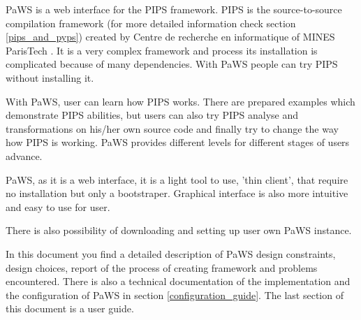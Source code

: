 PaWS is a web interface for the PIPS framework. PIPS is the source-to-source compilation framework (for more detailed information check section \ref{pips_and_pyps}) created by Centre de recherche en informatique of MINES ParisTech \cite{cri}. It is a very complex framework and process its installation is complicated because of many dependencies. With PaWS people can try PIPS without installing it.

With PaWS, user can learn how PIPS works. There are prepared examples which demonstrate PIPS abilities, but users can also try PIPS analyse and transformations on his/her own source code and finally try to change the way how PIPS is working. PaWS provides different levels for different stages of users advance.

PaWS, as it is a web interface, it is a light tool to use, 'thin client', that require no installation but only a bootstraper. Graphical interface is also more intuitive and easy to use for user.

There is also possibility of downloading and setting up user own PaWS instance.

In this document you find a detailed description of PaWS design constraints, design choices, report of the process of creating framework and problems encountered. There is also a technical documentation of the implementation and the configuration of PaWS in section \ref{configuration_guide}. The last section of this document is a user guide.
